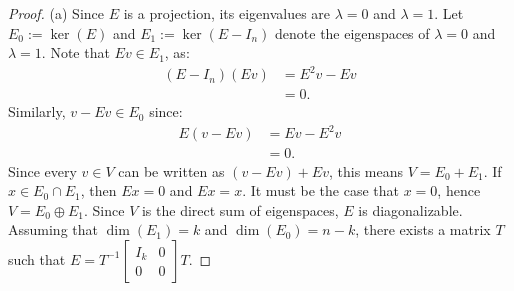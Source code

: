 	\begin{proof}
		(a) Since $E$ is a projection, its eigenvalues are $\lambda = 0$ and $\lambda =1$. Let $E_0 := \ker(E)$ and $E_1 := \ker(E - I_n)$ denote the eigenspaces of $\lambda = 0$ and $\lambda  = 1$. Note that $Ev \in E_1$, as:
		\begin{align*}
			(E-I_n)(Ev)
			&= E^2v - Ev\\
			&= 0.
		\end{align*}
		Similarly, $v-Ev \in E_0$ since:
		\begin{align*}
			E(v-Ev)
			&= Ev - E^2v \\
			&= 0.
		\end{align*}
		Since every $v \in V$ can be written as $(v - Ev) + Ev$, this means $V = E_0 + E_1$. If $x \in E_0 \cap E_1$, then $Ex = 0$ and $Ex = x$. It must be the case that $x = 0$, hence $V = E_0 \oplus E_1$. Since $V$ is the direct sum of eigenspaces, $E$ is diagonalizable. Assuming that $\dim(E_1) = k$ and $\dim(E_0) = n-k$, there exists a matrix $T$ such that $E = T^{-1}\begin{bmatrix} I_k & 0 \\ 0 & 0 \end{bmatrix} T$.


\end{proof}
